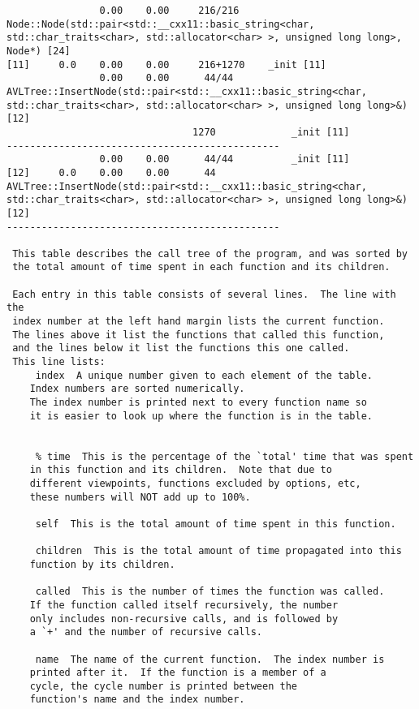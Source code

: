 \documentclass[12pt]{article}
\begin{document}
\begin{lstlisting}
                0.00    0.00     216/216         Node::Node(std::pair<std::__cxx11::basic_string<char, std::char_traits<char>, std::allocator<char> >, unsigned long long>, Node*) [24]
[11]     0.0    0.00    0.00     216+1270    _init [11]
                0.00    0.00      44/44          AVLTree::InsertNode(std::pair<std::__cxx11::basic_string<char, std::char_traits<char>, std::allocator<char> >, unsigned long long>&) [12]
                                1270             _init [11]
-----------------------------------------------
                0.00    0.00      44/44          _init [11]
[12]     0.0    0.00    0.00      44         AVLTree::InsertNode(std::pair<std::__cxx11::basic_string<char, std::char_traits<char>, std::allocator<char> >, unsigned long long>&) [12]
-----------------------------------------------

 This table describes the call tree of the program, and was sorted by
 the total amount of time spent in each function and its children.

 Each entry in this table consists of several lines.  The line with the
 index number at the left hand margin lists the current function.
 The lines above it list the functions that called this function,
 and the lines below it list the functions this one called.
 This line lists:
     index  A unique number given to each element of the table.
    Index numbers are sorted numerically.
    The index number is printed next to every function name so
    it is easier to look up where the function is in the table.


     % time  This is the percentage of the `total' time that was spent
    in this function and its children.  Note that due to
    different viewpoints, functions excluded by options, etc,
    these numbers will NOT add up to 100%.

     self  This is the total amount of time spent in this function.

     children  This is the total amount of time propagated into this
    function by its children.

     called  This is the number of times the function was called.
    If the function called itself recursively, the number
    only includes non-recursive calls, and is followed by
    a `+' and the number of recursive calls.

     name  The name of the current function.  The index number is
    printed after it.  If the function is a member of a
    cycle, the cycle number is printed between the
    function's name and the index number.



\end{lstlisting}
\end{document}
